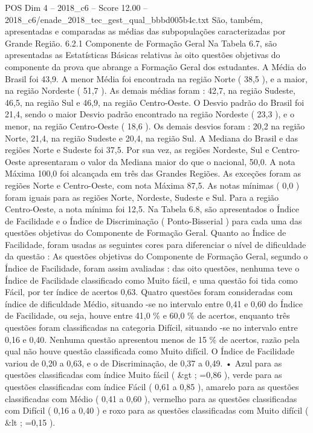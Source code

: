 \begin{textsample}{POS Dim 4 – 2018\_c6 – Score 12.00 – 2018\_c6/enade\_2018\_tec\_gest\_qual\_bbbd005b4c.txt}
São, também, apresentadas e comparadas as médias das subpopulações caracterizadas por Grande Região. 6.2.1 Componente de Formação Geral Na Tabela 6.7, são apresentadas as Estatísticas Básicas relativas às oito questões objetivas do componente da prova que abrange a Formação Geral dos estudantes.
A Média do Brasil foi 43,9.
A menor Média foi encontrada na região Norte ( 38,5 ), e a maior, na região Nordeste ( 51,7 ).
As demais médias foram : 42,7, na região Sudeste, 46,5, na região Sul e 46,9, na região Centro-Oeste.
O Desvio padrão do Brasil foi 21,4, sendo o maior Desvio padrão encontrado na região Nordeste ( 23,3 ), e o menor, na região Centro-Oeste ( 18,6 ).
Os demais desvios foram : 20,2 na região Norte, 21,4, na região Sudeste e 20,4, na região Sul.
A Mediana do Brasil e das regiões Norte e Sudeste foi 37,5.
Por sua vez, as regiões Nordeste, Sul e Centro-Oeste apresentaram o valor da Mediana maior do que o nacional, 50,0.
A nota Máxima 100,0 foi alcançada em três das Grandes Regiões.
As exceções foram as regiões Norte e Centro-Oeste, com nota Máxima 87,5.
As notas mínimas ( 0,0 ) foram iguais para as regiões Norte, Nordeste, Sudeste e Sul.
Para a região Centro-Oeste, a nota mínima foi 12,5.
Na Tabela 6.8, são apresentados o Índice de Facilidade e o Índice de Discriminação ( Ponto-Bisserial ) para cada uma das questões objetivas do Componente de Formação Geral.
Quanto ao Índice de Facilidade, foram usadas as seguintes cores para diferenciar o nível de dificuldade da questão : As questões objetivas do Componente de Formação Geral, segundo o Índice de Facilidade, foram assim avaliadas : das oito questões, nenhuma teve o Índice de Facilidade classificado como Muito fácil, e uma questão foi tida como Fácil, por ter índice de acertos 0,63.
Quatro questões foram consideradas com índice de dificuldade Médio, situando -se no intervalo entre 0,41 e 0,60 do Índice de Facilidade, ou seja, houve entre 41,0 \% e 60,0 \% de acertos, enquanto três questões foram classificadas na categoria Difícil, situando -se no intervalo entre 0,16 e 0,40.
Nenhuma questão apresentou menos de 15 \% de acertos, razão pela qual não houve questão classificada como Muito difícil.
O Índice de Facilidade variou de 0,20 a 0,63, e o de Discriminação, de 0,37 a 0,49. • Azul para as questões classificadas com índice Muito fácil ( \&gt ; =0,86 ), verde para as questões classificadas com índice Fácil ( 0,61 a 0,85 ), amarelo para as questões classificadas com Médio ( 0,41 a 0,60 ), vermelho para as questões classificadas com Difícil ( 0,16 a 0,40 ) e roxo para as questões classificadas com Muito difícil ( \&lt ; =0,15 ).

\end{textsample}

